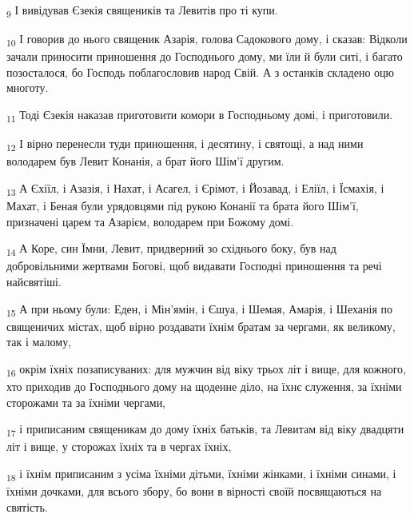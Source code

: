 \begin{tcolorbox}
\textsubscript{9} І вивідував Єзекія священиків та Левитів про ті купи.
\end{tcolorbox}
\begin{tcolorbox}
\textsubscript{10} І говорив до нього священик Азарія, голова Садокового дому, і сказав: Відколи зачали приносити приношення до Господнього дому, ми їли й були ситі, і багато позосталося, бо Господь поблагословив народ Свій. А з останків складено оцю многоту.
\end{tcolorbox}
\begin{tcolorbox}
\textsubscript{11} Тоді Єзекія наказав приготовити комори в Господньому домі, і приготовили.
\end{tcolorbox}
\begin{tcolorbox}
\textsubscript{12} І вірно перенесли туди приношення, і десятину, і святощі, а над ними володарем був Левит Конанія, а брат його Шім'ї другим.
\end{tcolorbox}
\begin{tcolorbox}
\textsubscript{13} А Єхіїл, і Азазія, і Нахат, і Асагел, і Єрімот, і Йозавад, і Еліїл, і Їсмахія, і Махат, і Беная були урядовцями під рукою Конанії та брата його Шім'ї, призначені царем та Азарієм, володарем при Божому домі.
\end{tcolorbox}
\begin{tcolorbox}
\textsubscript{14} А Коре, син Їмни, Левит, придверний зо східнього боку, був над добровільними жертвами Богові, щоб видавати Господні приношення та речі найсвятіші.
\end{tcolorbox}
\begin{tcolorbox}
\textsubscript{15} А при ньому були: Еден, і Мін'ямін, і Єшуа, і Шемая, Амарія, і Шеханія по священичих містах, щоб вірно роздавати їхнім братам за чергами, як великому, так і малому,
\end{tcolorbox}
\begin{tcolorbox}
\textsubscript{16} окрім їхніх позаписуваних: для мужчин від віку трьох літ і вище, для кожного, хто приходив до Господнього дому на щоденне діло, на їхнє служення, за їхніми сторожами та за їхніми чергами,
\end{tcolorbox}
\begin{tcolorbox}
\textsubscript{17} і приписаним священикам до дому їхніх батьків, та Левитам від віку двадцяти літ і вище, у сторожах їхніх та в чергах їхніх,
\end{tcolorbox}
\begin{tcolorbox}
\textsubscript{18} і їхнім приписаним з усіма їхніми дітьми, їхніми жінками, і їхніми синами, і їхніми дочками, для всього збору, бо вони в вірності своїй посвящаються на святість.
\end{tcolorbox}
